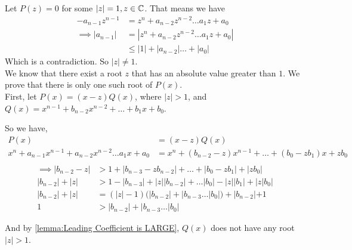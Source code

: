 	
	\begin{prooof}
		Let $ P(z) = 0 $ for some $ |z|=1, z\in\mathbb{C} $. That means we have 
		\begin{align*}
			-a_{n-1}z^{n-1} &=  z^n + a_{n-2}z^{n-2} \dots a_1z + a_0 \\
			\implies |a_{n-1}| &= |z^n + a_{n-2}z^{n-2} \dots a_1z + a_0|\\
			&\le |1| + |a_{n-2}| \dots + |a_0|
		\end{align*}
		Which is a contradiction. So $ |z|\ne 1 $.\\
		
		We know that there exist a root $ z $ that has an absolute value greater than $ 1 $. We prove that there is only one such root of $ P(x) $. \\
		
		First, let $ P(x)=(x-z)Q(x) $, where $ |z|>1 $, and $ Q(x) = x^{n-1} + b_{n-2}x^{n-2} + \dots + b_1x + b_0 $.
		
		So we have, 
		\begin{align*}
			P(x) &= (x-z)Q(x)\\
			x^n + a_{n-1}x^{n-1} + a_{n-2}x^{n-2} \dots a_1x + a_0 &= x^n + (b_{n-2} - z)x^{n-1} + \dots + (b_0-zb_1)x+ zb_0\\
		\end{align*}%
		\begin{align*}
			\implies |b_{n-2} - z| &> 1 + |b_{n-3} - zb_{n-2}| + \dots + |b_0 - zb_1| + |zb_0|\\[.5em]
			|b_{n-2}| + |z| & > 1 - |b_{n-3}| + |z||b_{n-2}| + \dots |b_0| - |z||b_1| + |z|b_0|\\[.5em]
			|b_{n-2}| + |z| &= (|z|-1)(|b_{n-2}| + |b_{n-3} \dots |b_0|) + |b_{n-2}| + 1\\[.5em]
			1 &> |b_{n-2}| + |b_{n-3} \dots |b_0|
		\end{align*}
		
		And by \autoref{lemma:Leading Coefficient is LARGE}, $ Q(x) $ does not have any root $ |z|>1 $. 
	\end{prooof}
		
	
	
	
